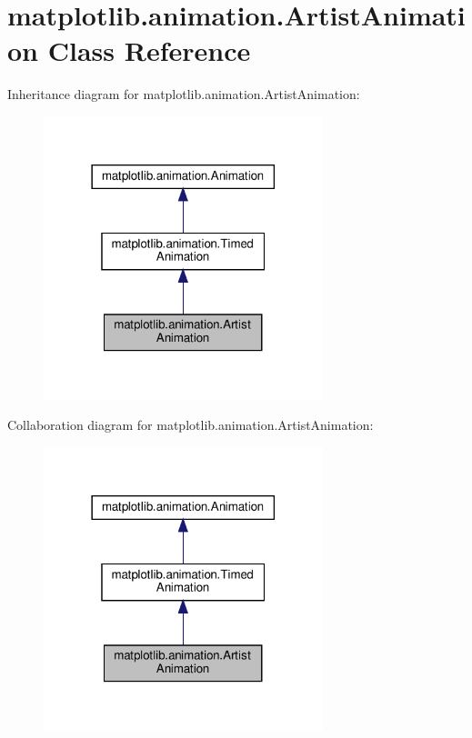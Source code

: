 \hypertarget{classmatplotlib_1_1animation_1_1ArtistAnimation}{}\section{matplotlib.\+animation.\+Artist\+Animation Class Reference}
\label{classmatplotlib_1_1animation_1_1ArtistAnimation}


Inheritance diagram for matplotlib.\+animation.\+Artist\+Animation\+:
\nopagebreak
\begin{figure}[H]
\begin{center}
\leavevmode
\includegraphics[width=230pt]{classmatplotlib_1_1animation_1_1ArtistAnimation__inherit__graph}
\end{center}
\end{figure}


Collaboration diagram for matplotlib.\+animation.\+Artist\+Animation\+:
\nopagebreak
\begin{figure}[H]
\begin{center}
\leavevmode
\includegraphics[width=230pt]{classmatplotlib_1_1animation_1_1ArtistAnimation__coll__graph}
\end{center}
\end{figure}
